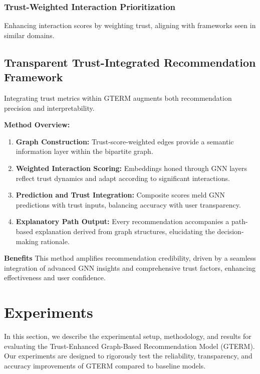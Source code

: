 \documentclass{article} %
\begin{document}
\subsubsection{Trust-Weighted Interaction Prioritization}

Enhancing interaction scores by weighting trust, aligning with frameworks seen in similar domains.

\subsection{Transparent Trust-Integrated Recommendation Framework}

Integrating trust metrics within GTERM augments both recommendation precision and interpretability.

\textbf{Method Overview:}

\begin{enumerate}
    \item \textbf{Graph Construction:} Trust-score-weighted edges provide a semantic information layer within the bipartite graph.
    
    \item \textbf{Weighted Interaction Scoring:} Embeddings honed through GNN layers reflect trust dynamics and adapt according to significant interactions.

    \item \textbf{Prediction and Trust Integration:} Composite scores meld GNN predictions with trust inputs, balancing accuracy with user transparency.

    \item \textbf{Explanatory Path Output:} Every recommendation accompanies a path-based explanation derived from graph structures, elucidating the decision-making rationale.
\end{enumerate}

\textbf{Benefits} This method amplifies recommendation credibility, driven by a seamless integration of advanced GNN insights and comprehensive trust factors, enhancing effectiveness and user confidence.


\section{Experiments}

In this section, we describe the experimental setup, methodology, and results for evaluating the Trust-Enhanced Graph-Based Recommendation Model (GTERM). Our experiments are designed to rigorously test the reliability, transparency, and accuracy improvements of GTERM compared to baseline models.
\end{document}
